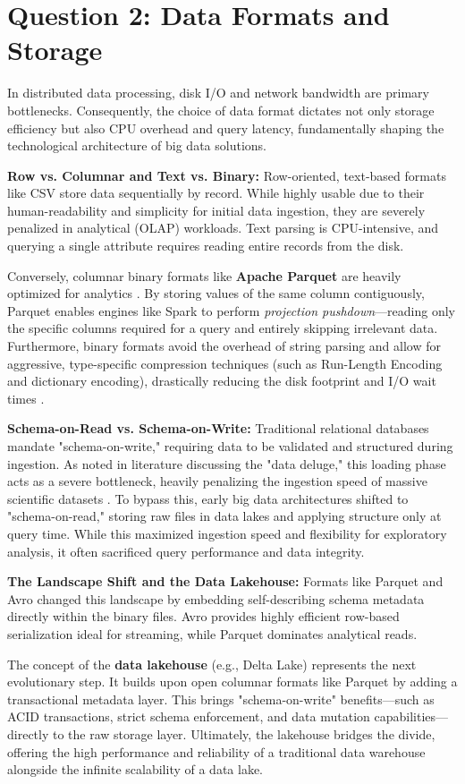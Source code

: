 \section{Question 2: Data Formats and Storage}

In distributed data processing, disk I/O and network bandwidth are primary bottlenecks. Consequently, the choice of data format dictates not only storage efficiency but also CPU overhead and query latency, fundamentally shaping the technological architecture of big data solutions.

\textbf{Row vs. Columnar and Text vs. Binary:} Row-oriented, text-based formats like CSV store data sequentially by record. While highly usable due to their human-readability and simplicity for initial data ingestion, they are severely penalized in analytical (OLAP) workloads. Text parsing is CPU-intensive, and querying a single attribute requires reading entire records from the disk.

Conversely, columnar binary formats like \textbf{Apache Parquet} are heavily optimized for analytics \cite{Zen+23}. By storing values of the same column contiguously, Parquet enables engines like Spark to perform \textit{projection pushdown}—reading only the specific columns required for a query and entirely skipping irrelevant data. Furthermore, binary formats avoid the overhead of string parsing and allow for aggressive, type-specific compression techniques (such as Run-Length Encoding and dictionary encoding), drastically reducing the disk footprint and I/O wait times \cite{Zen+23}.

\textbf{Schema-on-Read vs. Schema-on-Write:} Traditional relational databases mandate "schema-on-write," requiring data to be validated and structured during ingestion. As noted in literature discussing the "data deluge," this loading phase acts as a severe bottleneck, heavily penalizing the ingestion speed of massive scientific datasets \cite{Ker+11}. To bypass this, early big data architectures shifted to "schema-on-read," storing raw files in data lakes and applying structure only at query time. While this maximized ingestion speed and flexibility for exploratory analysis, it often sacrificed query performance and data integrity.

\textbf{The Landscape Shift and the Data Lakehouse:} Formats like Parquet and Avro changed this landscape by embedding self-describing schema metadata directly within the binary files. Avro provides highly efficient row-based serialization ideal for streaming, while Parquet dominates analytical reads.

The concept of the \textbf{data lakehouse} (e.g., Delta Lake) represents the next evolutionary step. It builds upon open columnar formats like Parquet by adding a transactional metadata layer. This brings "schema-on-write" benefits—such as ACID transactions, strict schema enforcement, and data mutation capabilities—directly to the raw storage layer. Ultimately, the lakehouse bridges the divide, offering the high performance and reliability of a traditional data warehouse alongside the infinite scalability of a data lake.
